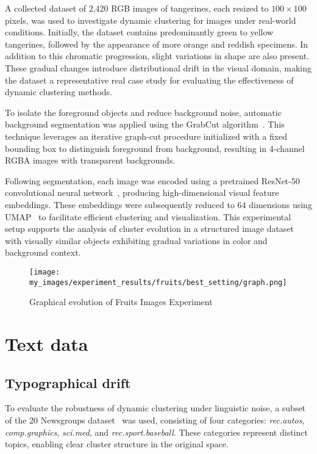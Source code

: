 A collected dataset of 2,420 RGB images of tangerines, each resized to $100
      \times 100$ pixels, was used to investigate dynamic clustering for images under
real-world conditions. Initially, the dataset contains predominantly green to
yellow tangerines, followed by the appearance of more orange and reddish
specimens. In addition to this chromatic progression, slight variations in
shape are also present. These gradual changes introduce distributional drift in
the visual domain, making the dataset a representative real case study for
evaluating the effectiveness of dynamic clustering methods.

To isolate the foreground objects and reduce background noise, automatic
background segmentation was applied using the GrabCut algorithm~\cite{grabcut}.
This technique leverages an iterative graph-cut procedure initialized with a
fixed bounding box to distinguish foreground from background, resulting in
4-channel RGBA images with transparent backgrounds.

Following segmentation, each image was encoded using a pretrained ResNet-50
convolutional neural network~\cite{resnet}, producing high-dimensional visual
feature embeddings. These embeddings were subsequently reduced to 64 dimensions
using UMAP~\cite{umap} to facilitate efficient clustering and visualization.
This experimental setup supports the analysis of cluster evolution in a
structured image dataset with visually similar objects exhibiting gradual
variations in color and background context.

\begin{figure}[h]
      \centering
      \texttt{[image: my\_images/experiment\_results/fruits/best\_setting/graph.png]}
      \caption{Graphical evolution of Fruits Images Experiment}
\end{figure}

\section{Text data}\label{sec:text_data}

\subsection{Typographical drift}\label{subsec:typographical_drift}
To evaluate the robustness of dynamic clustering under linguistic noise, a
subset of the 20 Newsgroups dataset~\cite{20newsgroups} was used, consisting of
four categories: \textit{rec.autos}, \textit{comp.graphics}, \textit{sci.med},
and \textit{rec.sport.baseball}. These categories represent distinct topics,
enabling clear cluster structure in the original space.

